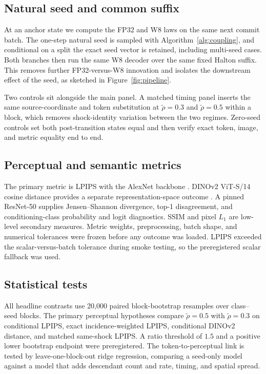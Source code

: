 \documentclass[11pt,a4paper]{article}
\theoremstyle{plain}
\theoremstyle{definition}
\theoremstyle{remark}
\newcommand{\rholabel}{\widetilde{\rho}}
\begin{document}
\subsection{Natural seed and common suffix}
At an anchor state we compute the FP32 and W8 laws on the same next commit batch.
The one-step natural seed is sampled with Algorithm~\ref{alg:coupling}, and
conditional on a split the exact seed vector is retained, including multi-seed
cases. Both branches then run the same W8 decoder over the same fixed Halton
suffix. This removes further FP32-versus-W8 innovation and isolates the
downstream effect of the seed, as sketched in Figure~\ref{fig:pipeline}.

Two controls sit alongside the main panel. A matched timing panel inserts the
same source-coordinate and token substitution at $\rholabel=0.3$ and $\rholabel=0.5$ within
a block, which removes shock-identity variation between the two regimes.
Zero-seed controls set both post-transition states equal and then verify exact
token, image, and metric equality end to end.

\subsection{Perceptual and semantic metrics}
The primary metric is LPIPS with the AlexNet backbone
\citep{zhang2018unreasonable}. DINOv2 ViT-S/14 cosine distance provides a
separate representation-space outcome \citep{oquab2024dinov2}. A pinned ResNet-50
supplies Jensen--Shannon divergence, top-1 disagreement, and conditioning-class
probability and logit diagnostics. SSIM and pixel $L_1$ are low-level secondary
measures. Metric weights, preprocessing, batch shape, and numerical tolerances
were frozen before any outcome was loaded. LPIPS exceeded the
scalar-versus-batch tolerance during smoke testing, so the preregistered scalar
fallback was used.

\subsection{Statistical tests}
All headline contrasts use 20{,}000 paired block-bootstrap resamples over
class--seed blocks. The primary perceptual hypotheses compare $\rholabel=0.5$ with
$\rholabel=0.3$ on conditional LPIPS, exact incidence-weighted LPIPS, conditional
DINOv2 distance, and matched same-shock LPIPS. A ratio threshold of $1.5$ and a
positive lower bootstrap endpoint were preregistered. The token-to-perceptual
link is tested by leave-one-block-out ridge regression, comparing a seed-only
model against a model that adds descendant count and rate, timing, and spatial
spread.
\end{document}
